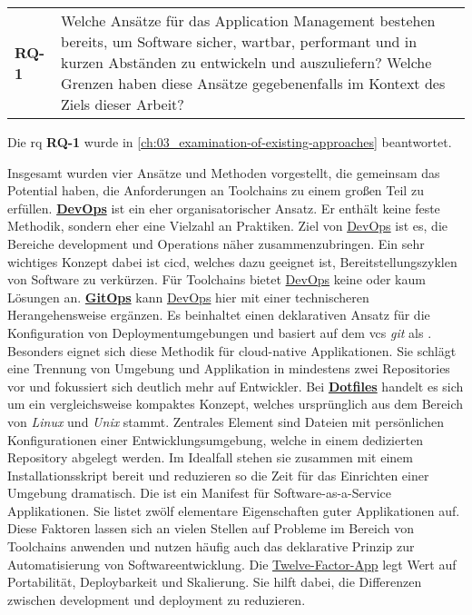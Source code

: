 \vspace{1em}
\begin{table}[H]
    \centering
    \begin{tabular}{p{} p{}}
        \textbf{RQ-1} & Welche Ansätze für das Application Management bestehen bereits, um Software sicher, wartbar, performant und in kurzen Abständen zu entwickeln und auszuliefern? Welche Grenzen haben diese Ansätze gegebenenfalls im Kontext des Ziels dieser Arbeit? \\
    \end{tabular}
\end{table}

Die \acrlong{rq} \textbf{RQ-1} wurde in \autoref{ch:03_examination-of-existing-approaches} beantwortet.

Insgesamt wurden vier Ansätze und Methoden vorgestellt, die gemeinsam das Potential haben, die Anforderungen an Toolchains zu einem großen Teil zu erfüllen. \textbf{\hyperref[sec:03-01_devops]{DevOps}} ist ein eher organisatorischer Ansatz. Er enthält keine feste Methodik, sondern eher eine Vielzahl an Praktiken. Ziel von \hyperref[sec:03-01_devops]{DevOps} ist es, die Bereiche \Gls{development} und Operations näher zusammenzubringen. Ein sehr wichtiges Konzept dabei ist \acrfull{cicd}, welches dazu geeignet ist, Bereitstellungszyklen von Software zu verkürzen. Für Toolchains bietet \hyperref[sec:03-01_devops]{DevOps} keine oder kaum Lösungen an. \textbf{\hyperref[sec:03-03_gitops]{GitOps}} kann \hyperref[sec:03-01_devops]{DevOps} hier mit einer technischeren Herangehensweise ergänzen. Es beinhaltet einen deklarativen Ansatz für die Konfiguration von Deploymentumgebungen und basiert auf dem \acrfull{vcs} \textit{\Gls{git}} als . Besonders eignet sich diese Methodik für \gls{cloud-native} Applikationen. Sie schlägt eine Trennung von Umgebung und Applikation in mindestens zwei Repositories vor und fokussiert sich deutlich mehr auf Entwickler. Bei \textbf{\hyperref[sec:03-04_dotfiles]{Dotfiles}} handelt es sich um ein vergleichsweise kompaktes Konzept, welches ursprünglich aus dem Bereich von \textit{Linux} und \textit{Unix} stammt. Zentrales Element sind Dateien mit persönlichen Konfigurationen einer Entwicklungsumgebung, welche in einem dedizierten Repository abgelegt werden. Im Idealfall stehen sie zusammen mit einem Installationsskript bereit und reduzieren so die Zeit für das Einrichten einer Umgebung dramatisch. Die \textbf{} ist ein Manifest für Software-as-a-Service Applikationen. Sie listet zwölf elementare Eigenschaften guter Applikationen auf. Diese Faktoren lassen sich an vielen Stellen auf Probleme im Bereich von Toolchains anwenden und nutzen häufig auch das deklarative Prinzip zur Automatisierung von Softwareentwicklung. Die \hyperref[sec:03-05_concept-of-twelve-factor-app]{Twelve-Factor-App} legt Wert auf Portabilität, Deploybarkeit und Skalierung. Sie hilft dabei, die Differenzen zwischen \Gls{development} und \Gls{deployment} zu reduzieren.

